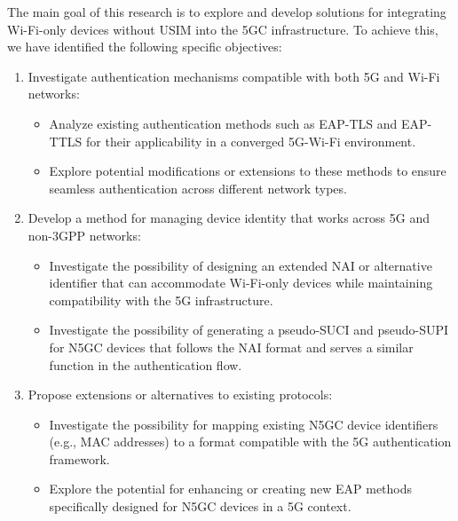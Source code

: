 
The main goal of this research is to explore and develop solutions for integrating Wi-Fi-only devices without \ac{USIM} into the \ac{5GC} infrastructure. To achieve this, we have identified the following specific objectives:

\begin{enumerate}
    \item{
        Investigate authentication mechanisms compatible with both \ac{5G} and Wi-Fi networks:
        \begin{itemize}
            \item Analyze existing authentication methods such as \ac{EAP-TLS} and \ac{EAP-TTLS} for their applicability in a converged 5G-Wi-Fi environment.
            \item Explore potential modifications or extensions to these methods to ensure seamless authentication across different network types.
        \end{itemize}
    }
    \item{
        Develop a method for managing device identity that works across \ac{5G} and non-\ac{3GPP} networks:
        \begin{itemize}
            \item Investigate the possibility of designing an extended \ac{NAI} or alternative identifier that can accommodate Wi-Fi-only devices while maintaining compatibility with the \ac{5G} infrastructure.
            \item Investigate the possibility of generating a pseudo-\ac{SUCI} and pseudo-\ac{SUPI} for \ac{N5GC} devices that follows the \ac{NAI} format and serves a similar function in the authentication flow.
        \end{itemize}
    }
    \item{
        Propose extensions or alternatives to existing protocols:
        \begin{itemize}
            \item Investigate the possibility for mapping existing \ac{N5GC} device identifiers (e.g., \ac{MAC} addresses) to a format compatible with the \ac{5G} authentication framework.
            \item Explore the potential for enhancing or creating new \ac{EAP} methods specifically designed for \ac{N5GC} devices in a \ac{5G} context.
        \end{itemize}
    }
\end{enumerate}

